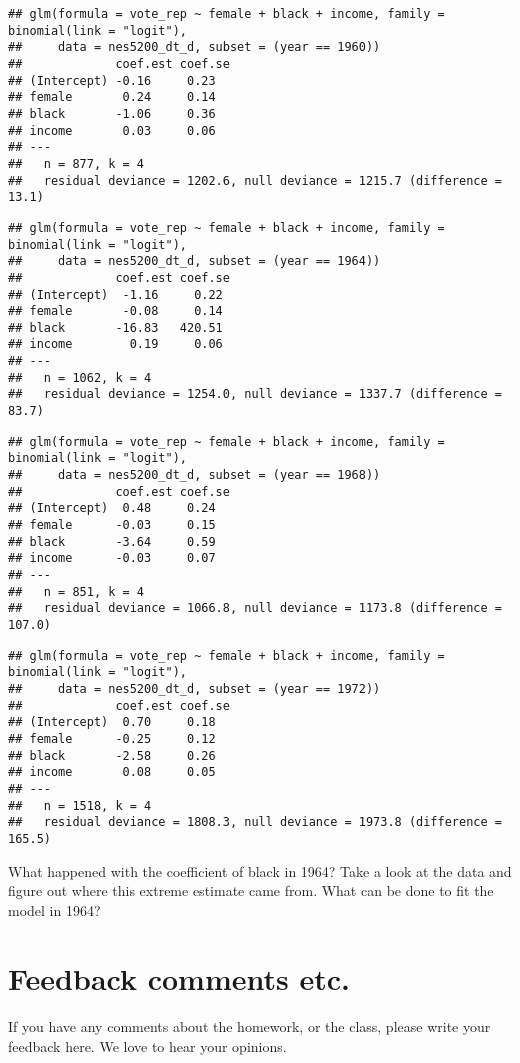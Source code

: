 \documentclass[]{article}
\begin{document}
\begin{verbatim}
## glm(formula = vote_rep ~ female + black + income, family = binomial(link = "logit"), 
##     data = nes5200_dt_d, subset = (year == 1960))
##             coef.est coef.se
## (Intercept) -0.16     0.23  
## female       0.24     0.14  
## black       -1.06     0.36  
## income       0.03     0.06  
## ---
##   n = 877, k = 4
##   residual deviance = 1202.6, null deviance = 1215.7 (difference = 13.1)
\end{verbatim}

\begin{verbatim}
## glm(formula = vote_rep ~ female + black + income, family = binomial(link = "logit"), 
##     data = nes5200_dt_d, subset = (year == 1964))
##             coef.est coef.se
## (Intercept)  -1.16     0.22 
## female       -0.08     0.14 
## black       -16.83   420.51 
## income        0.19     0.06 
## ---
##   n = 1062, k = 4
##   residual deviance = 1254.0, null deviance = 1337.7 (difference = 83.7)
\end{verbatim}

\begin{verbatim}
## glm(formula = vote_rep ~ female + black + income, family = binomial(link = "logit"), 
##     data = nes5200_dt_d, subset = (year == 1968))
##             coef.est coef.se
## (Intercept)  0.48     0.24  
## female      -0.03     0.15  
## black       -3.64     0.59  
## income      -0.03     0.07  
## ---
##   n = 851, k = 4
##   residual deviance = 1066.8, null deviance = 1173.8 (difference = 107.0)
\end{verbatim}

\begin{verbatim}
## glm(formula = vote_rep ~ female + black + income, family = binomial(link = "logit"), 
##     data = nes5200_dt_d, subset = (year == 1972))
##             coef.est coef.se
## (Intercept)  0.70     0.18  
## female      -0.25     0.12  
## black       -2.58     0.26  
## income       0.08     0.05  
## ---
##   n = 1518, k = 4
##   residual deviance = 1808.3, null deviance = 1973.8 (difference = 165.5)
\end{verbatim}

What happened with the coefficient of black in 1964? Take a look at the
data and figure out where this extreme estimate came from. What can be
done to fit the model in 1964?

\section{Feedback comments etc.}\label{feedback-comments-etc.}

If you have any comments about the homework, or the class, please write
your feedback here. We love to hear your opinions.
\end{document}
